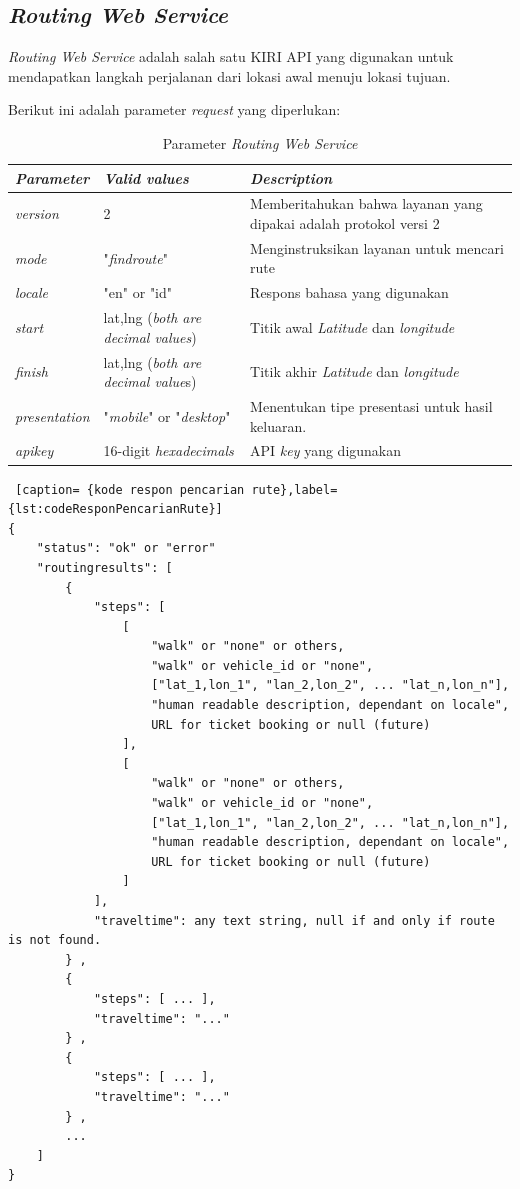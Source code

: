 \subsection{\textit{Routing Web Service}}
\textit{Routing Web Service} adalah salah satu KIRI API yang digunakan untuk mendapatkan langkah perjalanan dari lokasi awal menuju lokasi tujuan.

Berikut ini adalah parameter \textit{request} yang diperlukan:

\begin{table}[h]
	\caption{Parameter \textit{Routing Web Service}}
	\label{tab:TabelParameterRoutingWebService}
\begin{tabular}{ |p{3cm}|p{3cm}|p{8cm}| }
	\hline
	\textit{Parameter} & \textit{Valid values} & \textit{Description} \\ \hline \hline
  \textit{version} & 2 & Memberitahukan bahwa layanan yang dipakai adalah protokol versi 2 \\ \hline
  \textit{mode} & "\textit{findroute}" & Menginstruksikan layanan untuk mencari rute \\ \hline
  \textit{locale} & "en" or "id" & Respons bahasa yang digunakan \\ \hline
	\textit{start} & lat,lng (\textit{both are decimal values}) & Titik awal \textit{Latitude} dan \textit{longitude} \\ \hline
  \textit{finish} & lat,lng (\textit{both are decimal value}s) & Titik akhir \textit{Latitude} dan \textit{longitude}  \\ \hline
  \textit{presentation} & "\textit{mobile}" or "\textit{desktop}" & Menentukan tipe presentasi untuk hasil keluaran. \\ \hline
	\textit{apikey} & 16-digit \textit{hexadecimals} & API \textit{key} yang digunakan \\ \hline
\end{tabular}
	\end{table}
	
\begin{lstlisting} [caption= {kode respon pencarian rute},label={lst:codeResponPencarianRute}]
{ 
    "status": "ok" or "error" 
    "routingresults": [ 
        {
            "steps": [
                [
                    "walk" or "none" or others,
                    "walk" or vehicle_id or "none",
                    ["lat_1,lon_1", "lan_2,lon_2", ... "lat_n,lon_n"],
                    "human readable description, dependant on locale",
                    URL for ticket booking or null (future)
                ],
                [
                    "walk" or "none" or others,
                    "walk" or vehicle_id or "none",
                    ["lat_1,lon_1", "lan_2,lon_2", ... "lat_n,lon_n"],
                    "human readable description, dependant on locale",
                    URL for ticket booking or null (future)
                ]
            ],
            "traveltime": any text string, null if and only if route is not found.
        } ,
        {
            "steps": [ ... ],
            "traveltime": "..."
        } ,
        {
            "steps": [ ... ],
            "traveltime": "..."
        } ,
        ...     
    ]
}
\end{lstlisting}

